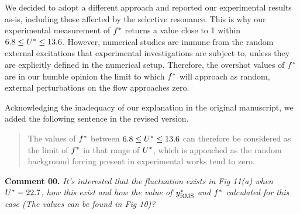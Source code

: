 \documentclass[10pt]{article}
\newcounter{question}
\newcommand{\name}{00}
\newcommand{\question}[1]{\refstepcounter{question} \noindent \textbf{Comment \name.\thequestion}\vskip 0.25cm \noindent \emph{#1}\\}
\begin{document}
{  We decided to adopt a different approach and reported our experimental results as-is, including those affected by the selective resonance. This is why our experimental measurement of $f^{*}$ returns a value close to 1 within $6.8 \leq U^{*} \leq 13.6$. However, numerical studies are immune from the random external excitations that experimental investigations are subject to, unless they are explicitly defined in the numerical setup. Therefore, the overshot values of $f^{*}$ are in our humble opinion the limit to which $f^{*}$ will approach as random, external perturbations on the flow approaches zero.

  Acknowledging the inadequacy of our explanation in the original manuscript, we added the following sentence in the revised version.

  \begin{quotation}
    \color{blue}
    \noindent The values of $f^{*}$ between $6.8 \leq U^{*} \leq 13.6$ can therefore be considered as the limit of $f^{*}$ in that range of $U^{*}$, which is appoached as the random background forcing present in experimental works tend to zero.
    \color{black}
  \end{quotation}

}

\question{It's interested that the fluctuation exists in Fig 11(a) when $U^{*} = 22.7$, how this exist and how the value of $y^{*}_{\text{RMS}}$ and $f^{*}$ calculated for this case (The values can be found in Fig 10)?}
\end{document}
